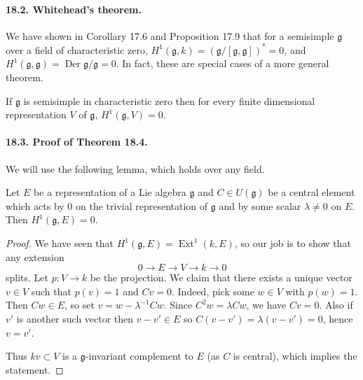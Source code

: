 \paragraph{18.2. Whitehead's theorem.}
We have shown in Corollary 17.6 and Proposition 17.9 that for a semisimple $\mathfrak g$ over a field of characteristic zero, $H^1(\mathfrak g,k)=(\mathfrak g/[\mathfrak g,\mathfrak g])^*=0$, and $H^1(\mathfrak g,\mathfrak g)=\operatorname{Der}\mathfrak g/\mathfrak g=0$. In fact, these are special cases of a more general theorem.

\begin{theorem}[18.4; Whitehead]
If $\mathfrak g$ is semisimple in characteristic zero then for every finite dimensional representation $V$ of $\mathfrak g$, $H^1(\mathfrak g,V)=0$.
\end{theorem}

\paragraph{18.3. Proof of Theorem 18.4.}
We will use the following lemma, which holds over any field.
\begin{lemma}[18.5]
Let $E$ be a representation of a Lie algebra $\mathfrak g$ and $C\in U(\mathfrak g)$ be a central element which acts by $0$ on the trivial representation of $\mathfrak g$ and by some scalar $\lambda\ne0$ on $E$. Then $H^1(\mathfrak g,E)=0$.
\end{lemma}
\begin{proof}
We have seen that $H^1(\mathfrak g,E)=\operatorname{Ext}^1(k,E)$, so our job is to show that any extension
\[
0\to E\to V\to k\to0
\]
splits. Let $p:V\to k$ be the projection. We claim that there exists a unique vector $v\in V$ such that $p(v)=1$ and $Cv=0$. Indeed, pick some $w\in V$ with $p(w)=1$. Then $Cw\in E$, so set $v=w-\lambda^{-1}Cw$. Since $C^2w=\lambda Cw$, we have $Cv=0$. Also if $v'$ is another such vector then $v-v'\in E$ so $C(v-v')=\lambda(v-v')=0$, hence $v=v'$.

Thus $kv\subset V$ is a $\mathfrak g$-invariant complement to $E$ (as $C$ is central), which implies the statement.
\end{proof}

